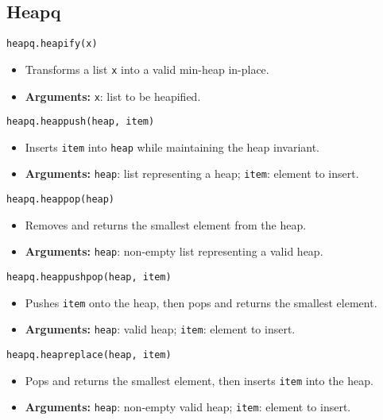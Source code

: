 \subsection{Heapq}
\begin{summary}
\begin{lstlisting}
heapq.heapify(x)
\end{lstlisting}
\begin{itemize}
    \item Transforms a list \texttt{x} into a valid min-heap in-place.
    \item \textbf{Arguments:} \texttt{x}: list to be heapified.
\end{itemize}

\begin{lstlisting}
heapq.heappush(heap, item)
\end{lstlisting}
\begin{itemize}
    \item Inserts \texttt{item} into \texttt{heap} while maintaining the heap invariant.
    \item \textbf{Arguments:} \texttt{heap}: list representing a heap; \texttt{item}: element to insert.
\end{itemize}

\begin{lstlisting}
heapq.heappop(heap)
\end{lstlisting}
\begin{itemize}
    \item Removes and returns the smallest element from the heap.
    \item \textbf{Arguments:} \texttt{heap}: non-empty list representing a valid heap.
\end{itemize}

\begin{lstlisting}
heapq.heappushpop(heap, item)
\end{lstlisting}
\begin{itemize}[noitemsep]
    \item Pushes \texttt{item} onto the heap, then pops and returns the smallest element.
    \item \textbf{Arguments:} \texttt{heap}: valid heap; \texttt{item}: element to insert.
\end{itemize}
    
\begin{lstlisting}
heapq.heapreplace(heap, item)
\end{lstlisting}
\begin{itemize}
    \item Pops and returns the smallest element, then inserts \texttt{item} into the heap.
    \item \textbf{Arguments:} \texttt{heap}: non-empty valid heap; \texttt{item}: element to insert.
\end{itemize}


\end{summary}
